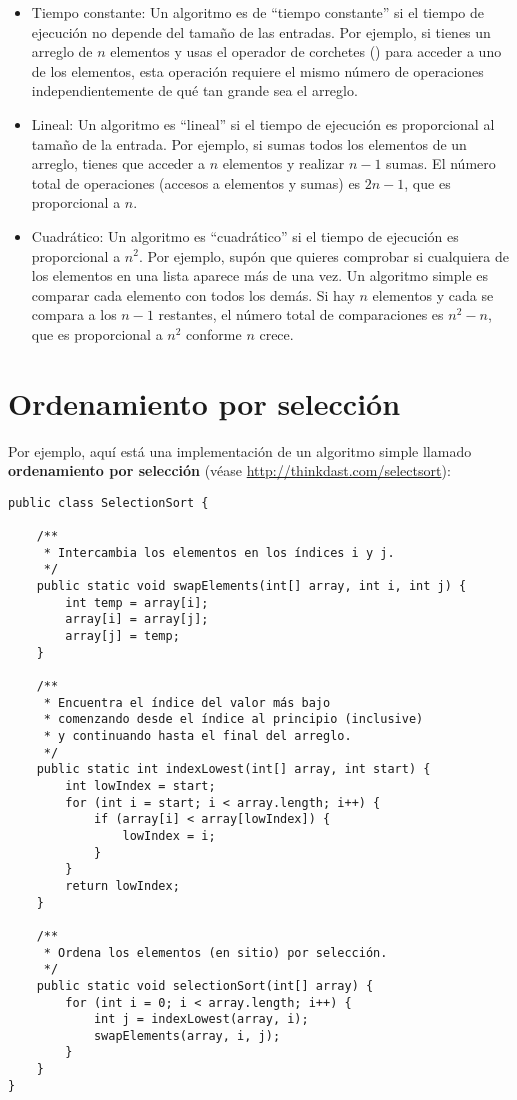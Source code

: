 \documentclass[12pt]{book}
\theoremstyle{exercise}
\begin{document}
\begin{itemize}

\item Tiempo constante: Un algoritmo es de ``tiempo constante'' si el tiempo de ejecución
  no depende del tamaño de las entradas. Por ejemplo, si tienes un
  arreglo de $n$ elementos y usas el operador de corchetes
  (\java{[]}) para acceder a uno de los elementos, esta operación requiere el mismo
  número de operaciones independientemente de qué tan grande sea el arreglo.

\item Lineal: Un algoritmo es ``lineal'' si el tiempo de ejecución es
  proporcional al tamaño de la entrada. Por ejemplo, si sumas todos los
  elementos de un arreglo, tienes que acceder a $n$ elementos y
  realizar $n-1$ sumas. El número total de operaciones
  (accesos a elementos y sumas) es $2n-1$, que es proporcional
  a $n$.

\item Cuadrático: Un algoritmo es ``cuadrático'' si el tiempo de ejecución es
  proporcional a $n^2$.  Por ejemplo, supón que quieres comprobar si cualquiera
  de los elementos en una lista aparece más de una vez. Un algoritmo simple
  es comparar cada elemento con todos los demás. Si hay
  $n$ elementos y cada se compara a los $n-1$ restantes, el número
  total de comparaciones es $n^2 -n$, que es proporcional a
  $n^2$ conforme $n$ crece.

\end{itemize}


\section{Ordenamiento por selección}
\label{selection-sort}


Por ejemplo, aquí está una implementación de un algoritmo simple llamado
{\bf ordenamiento por selección}
(véase \url{http://thinkdast.com/selectsort}):

\begin{verbatim}
public class SelectionSort {

    /**
     * Intercambia los elementos en los índices i y j.
     */
    public static void swapElements(int[] array, int i, int j) {
        int temp = array[i];
        array[i] = array[j];
        array[j] = temp;
    }

    /**
     * Encuentra el índice del valor más bajo
     * comenzando desde el índice al principio (inclusive)
     * y continuando hasta el final del arreglo.
     */
    public static int indexLowest(int[] array, int start) {
        int lowIndex = start;
        for (int i = start; i < array.length; i++) {
            if (array[i] < array[lowIndex]) {
                lowIndex = i;
            }
        }
        return lowIndex;
    }

    /**
     * Ordena los elementos (en sitio) por selección.
     */
    public static void selectionSort(int[] array) {
        for (int i = 0; i < array.length; i++) {
            int j = indexLowest(array, i);
            swapElements(array, i, j);
        }
    }
}
\end{verbatim}
\end{document}
